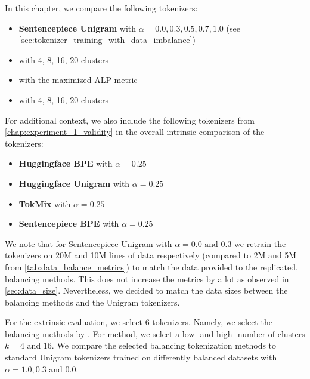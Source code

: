 In this chapter, we compare the following tokenizers:

\begin{itemize}
    \item \textbf{Sentencepiece Unigram} with $\alpha=0.0, 0.3, 0.5, 0.7, 1.0$ (see \autoref{sec:tokenizer_training_with_data_imbalance})
    \item \textbf{\citet{chung_improving_2020}} with 4, 8, 16, 20 clusters
    \item \textbf{\citet{zheng_allocating_2021}} with the maximized ALP metric
    \item \textbf{\citet{liang_xlm-v_2023}} with 4, 8, 16, 20 clusters
\end{itemize}

For additional context, we also include the following tokenizers from \autoref{chap:experiment_1_validity} in the overall intrinsic comparison of the tokenizers:
\begin{itemize}
    \item \textbf{Huggingface BPE} with $\alpha=0.25$
    \item \textbf{Huggingface Unigram} with $\alpha=0.25$
    \item \textbf{TokMix} with $\alpha=0.25$
    \item \textbf{Sentencepiece BPE} with $\alpha=0.25$
\end{itemize}

 We note that for Sentencepiece Unigram with $\alpha=0.0\text{ and }0.3$ we retrain the tokenizers on 20M and 10M lines of data respectively (compared to 2M and 5M from \autoref{tab:data_balance_metrics}) to match the data provided to the replicated, balancing methods. This does not increase the metrics by a lot as observed in \autoref{sec:data_size}. Nevertheless, we decided to match the data sizes between the balancing methods and the Unigram tokenizers.

For the extrinsic evaluation, we select 6 tokenizers. Namely, we select the balancing methods by \citet{chung_improving_2020,zheng_allocating_2021}. For  method, we select a low- and high- number of clusters $k=4\text{ and }16$. We compare the selected balancing tokenization methods to standard Unigram tokenizers trained on differently balanced datasets with $\alpha=1.0, 0.3\text{ and }0.0$.


